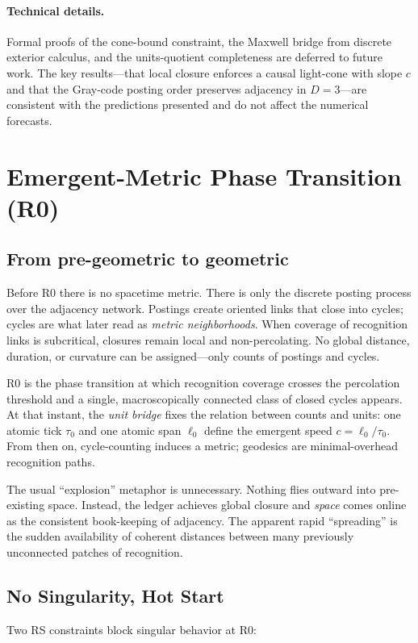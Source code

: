 \documentclass[11pt]{article}
\theoremstyle{definition}
\theoremstyle{remark}
\begin{document}
\paragraph{Technical details.}
Formal proofs of the cone-bound constraint, the Maxwell bridge from discrete exterior calculus, and the units-quotient completeness are deferred to future work. The key results—that local closure enforces a causal light-cone with slope \(c\) and that the Gray-code posting order preserves adjacency in \(D=3\)—are consistent with the predictions presented and do not affect the numerical forecasts.

\section{Emergent-Metric Phase Transition (R0)}

\subsection{From pre-geometric to geometric}
Before R0 there is no spacetime metric. There is only the discrete posting process over the adjacency network. Postings create oriented links that close into cycles; cycles are what later read as \emph{metric neighborhoods}. When coverage of recognition links is subcritical, closures remain local and non-percolating. No global distance, duration, or curvature can be assigned—only counts of postings and cycles.

R0 is the phase transition at which recognition coverage crosses the percolation threshold and a single, macroscopically connected class of closed cycles appears. At that instant, the \emph{unit bridge} fixes the relation between counts and units: one atomic tick \(\tau_0\) and one atomic span \(\ell_0\) define the emergent speed \(c=\ell_0/\tau_0\). From then on, cycle-counting induces a metric; geodesics are minimal-overhead recognition paths.

The usual “explosion” metaphor is unnecessary. Nothing flies outward into pre-existing space. Instead, the ledger achieves global closure and \emph{space} comes online as the consistent book-keeping of adjacency. The apparent rapid “spreading” is the sudden availability of coherent distances between many previously unconnected patches of recognition.

\subsection{No Singularity, Hot Start}
Two RS constraints block singular behavior at R0:
\end{document}
